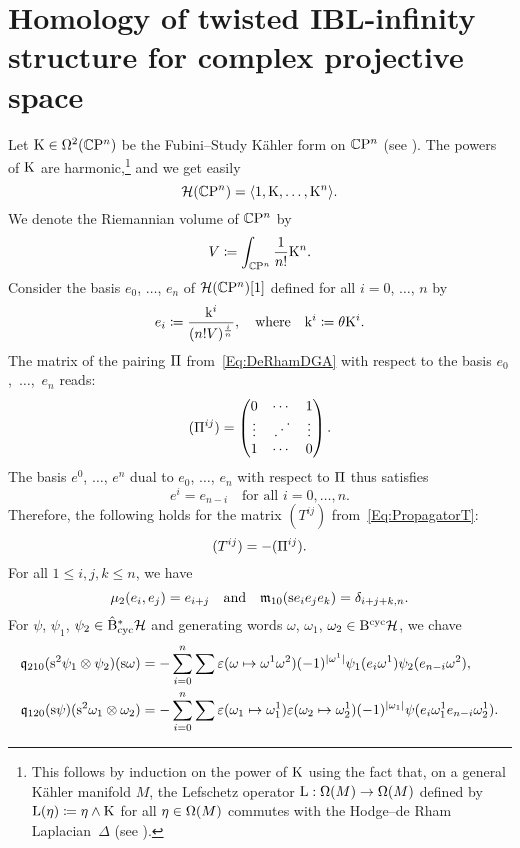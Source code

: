 \documentclass[\MainFolder/Text.tex]{subfiles}
\begin{document}
\section{Homology of twisted IBL-infinity structure for complex projective space}
\label{Section:CPn1}
Let $\mathrm{K}\in \Omega^2(\mathbb{C}\mathrm{P}^n)$ be the Fubini--Study K\"ahler form on $\mathbb{C}\mathrm{P}^n$ (see \cite[Examples 3.1.9]{Huybrechts2004}). The powers of $\mathrm{K}$ are harmonic,\footnote{This follows by induction on the power of $\mathrm{K}$ using the fact that, on a general K\"ahler manifold $M$, the Lefschetz operator $\operatorname{L}: \Omega(M)\rightarrow \Omega(M)$ defined by $\operatorname{L}(\eta)\coloneqq \eta \wedge \mathrm{K}$ for all $\eta\in \Omega(M)$ commutes with the Hodge--de Rham Laplacian~$\Delta$ (see \cite[Chapter 3]{Huybrechts2004}). } and we get easily
\[ \mathcal{H}(\mathbb{C}\mathrm{P}^n) = \langle 1,\mathrm{K}, \dotsc, \mathrm{K}^n \rangle. \]
We denote the Riemannian volume of $\mathbb{C}\mathrm{P}^n$ by
\[ V\coloneqq \int_{\mathbb{C}\mathrm{P}^n} \frac{1}{n!}\mathrm{K}^n. \]
Consider the basis $e_0$, $\dotsc$, $e_n$ of $\mathcal{H}(\mathbb{C}\mathrm{P}^n)[1]$ defined for all $i=0$, $\dotsc$, $n$ by
\[ e_i\coloneqq \frac{\mathrm{k}^i}{(n! V)^{\frac{i}{n}}}, \quad \text{where}\quad\mathrm{k}^i\coloneqq \theta \mathrm{K}^i. \]
The matrix of the pairing $\Pi$ from~\eqref{Eq:DeRhamDGA} with respect to the basis $e_0$,~$\dotsc$,~$e_{n}$ reads:
\[ (\Pi^{ij}) = \begin{pmatrix}
0 & \dotsb & 1 \\
\vdots & {\displaystyle\, .^{{\displaystyle \, .^{\displaystyle\,.}}}} & \vdots \\
1 & \dotsb & 0
\end{pmatrix}. \]
The basis $e^0$, $\dotsc$, $e^n$ dual to $e_0$, $\dotsc$, $e_n$ with respect to $\Pi$ thus satisfies
\[ e^i = e_{n-i}\quad\text{for all }i=0,\dotsc,n. \]
Therefore, the following holds for the matrix $(T^{ij})$ from~\eqref{Eq:PropagatorT}:
\begin{equation*}
(T^{ij}) = - (\Pi^{ij}).
\end{equation*}
For all $1\le i, j, k \le n$, we have
\[ \mu_2(e_i, e_j) = e_{i+j}\quad \text{and}\quad
\mathfrak{m}_{10}(\mathrm{s} e_{i}e_j e_k) = \delta_{i+j+k,n}. \]
For $\psi$, $\psi_1$, $\psi_2 \in \hat{\mathrm{B}}_{\mathrm{cyc}}^* \mathcal{H}$ and generating words $\omega$, $\omega_1$, $\omega_2 \in \mathrm{B}^{\mathrm{cyc}}\mathcal{H}$, we chave
\begin{equation*}
\begin{aligned}
\mathfrak{q}_{210}(\mathrm{s}^2 \psi_1 \otimes \psi_2)(\mathrm{s} \omega) &= -\sum_{i=0}^n \sum \varepsilon(\omega\mapsto \omega^1\omega^2)(-1)^{|\omega^1|} \psi_1(e_i \omega^1)\psi_2(e_{n-i}\omega^2), \\
\mathfrak{q}_{120}(\mathrm{s} \psi)(\mathrm{s}^2 \omega_1 \otimes \omega_2) & = - \sum_{i=0}^n \sum \varepsilon(\omega_1 \mapsto \omega_1^1)\varepsilon(\omega_2\mapsto \omega_2^1) (-1)^{|\omega_1|} \psi(e_i \omega_1^1 e_{n-i} \omega_2^1).
\end{aligned}
\end{equation*}
\end{document}
